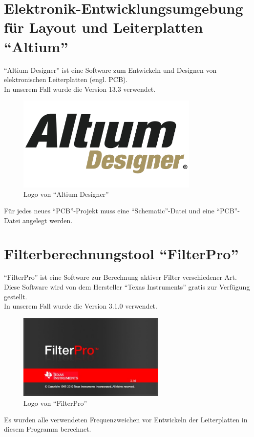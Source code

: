 \section{Elektronik-Entwicklungsumgebung für Layout und Leiterplatten \enquote{Altium}} \label{sec:6.1}
\enquote{Altium Designer} ist eine Software zum Entwickeln und Designen von elektronischen Leiterplatten (engl. PCB).\\
In unserem Fall wurde die Version 13.3 verwendet. 
\begin{figure} [H]
	\centering
	\includegraphics[width=0.8\textwidth]{img/Grundlagen/Altium/ad_logo.png}
	\caption[Logo von \enquote{Altium Designer}]{Logo von \enquote{Altium Designer}\footnotemark}
	\label{fig:6.1.1}
\end{figure}
Für jedes neues \enquote{PCB}-Projekt muss eine \enquote{Schematic}-Datei und eine \enquote{PCB}-Datei angelegt werden.

\newpage
\section{Filterberechnungstool \enquote{FilterPro}}\label{sec:6.2}
\enquote{FilterPro} ist eine Software zur Berechnung aktiver Filter verschiedener Art.
Diese Software wird von dem Hersteller \enquote{Texas Instruments} gratis zur Verfügung gestellt.\\
In unserem Fall wurde die Version 3.1.0 verwendet. 
\begin{figure} [H]
	\centering
	\includegraphics[width=0.65\textwidth]{img/VerwendeteTools/FilterPro.jpg}
	\caption[Logo von \enquote{FilterPro}]{Logo von \enquote{FilterPro}}
	\label{fig:6.2.1}
\end{figure}
Es wurden alle verwendeten Frequenzweichen vor Entwickeln der Leiterplatten in diesem Programm berechnet.
